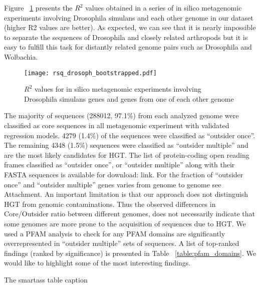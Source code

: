Figure ~\ref{fig:rsquared_curve} presents the $R^2$ values obtained in a series of in silico metagenomic
experiments involving Drosophila simulans and each other genome in our dataset
(higher R2 values are better). As expected, we can see that it is nearly
impossible to separate the sequences of Drosophila and closely related
arthropods but it is easy to fulfill this task for distantly related genome
pairs such as Drosophila and Wolbachia.
\begin{center}
\begin{figure}
\texttt{[image: rsq\_drosoph\_bootstrapped.pdf]}
\caption{$R^2$ values for in silico metagenomic experiments involving Drosophila simulans genes and genes from one of each other genome}
\label{fig:rsquared_curve}
\end{figure}
\end{center}
The majority of sequences
(288012, 97.1\%) from each analyzed genome were classified as core sequences in
all metagenomic experiment with validated regression models. 4279 (1.4\%) of
the sequences were classified as “outsider once”. The remaining 4348 (1.5\%)
sequences were classified as “outsider multiple” and are the most likely
candidates for HGT. The list of protein-coding open reading frames classified
as “outsider once”, or “outsider multiple” along with their FASTA sequences is
available for download: link. For the fraction of “outsider once” and “outsider
multiple” genes varies from genome to genome see Attachment.
An important limitation is that our approach does not distinguish HGT from genomic
contaminations. Thus the observed differences in Core/Outsider ratio between
different genomes, does not necessarily indicate that some genomes are more
prone to the acquisition of sequences due to HGT. We used a PFAM analysis to
check for any PFAM domains are significantly overrepresented in “outsider
multiple” sets of sequences. A list of top-ranked findings (ranked by
significance) is presented in Table ~\ref{table:pfam_domains}. We would like to highlight some of the
most interesting findings.
\begin{center}
\begin{table}
\caption{The smartass table caption}
\label{table:pfam_domains}
\end{table}
\end{center}
